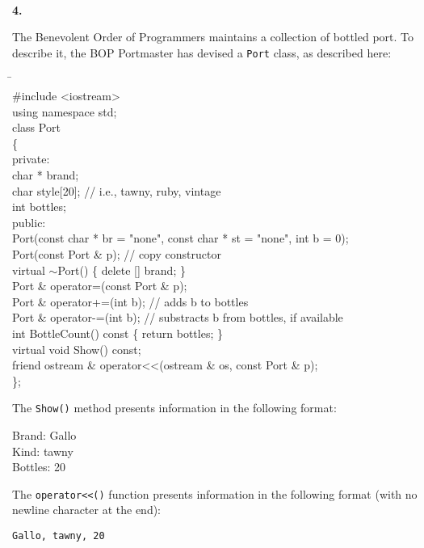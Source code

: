 \documentclass[10 pt]{amsart}
\newlength{\cwidth}
\newenvironment{cpart}[2][\cwidth]
	{%
		\\ %
		\textbf{#2. }%
		\begin{minipage}[t]{#1}%
		\setlength{\parindent}{0pt}%
		\setlength{\parskip}{2ex}%
	}
	{%
		\end{minipage}%
	}
\newcommand{\ttt}[1]{\texttt{#1}}
\begin{document}
	\begin{cpart}{4}
		The Benevolent Order of Programmers maintains a collection of 
		bottled port.
		To describe it, the BOP Portmaster has devised a \ttt{Port}
		class, as described here:
		{\ttfamily
			\begin{tabbing}
				\phantom{\qquad}\=\hspace{6cm}\=\\
				\#include <iostream> \\
				using namespace std; \\
				class Port \\
				\{ \\
				private:
				\+ \\
					char * brand; \\
					char style[20]; // i.e., tawny, ruby, vintage \\
					int bottles; \\
				\< public: \\
					Port(const char * br = "none", 
						const char * st = "none", int b = 0); \\
						Port(const Port \& p); \> // copy constructor \\
						virtual $\sim$Port() \{ delete [] brand; \} \\
						Port \& operator=(const Port \& p); \\
						Port \& operator+=(int b); \> // adds b to bottles \\
						Port \& operator-=(int b); \> 
							// substracts b from bottles, if available \\
						int BottleCount() const \{ return bottles; \} \\
						virtual void Show() const; \\
						friend ostream \& operator<<(ostream & os, 
																const Port \& p); \\
				\< \};
			\end{tabbing}
		}
		The \ttt{Show()} method presents information in the following
		format:
		
		{ \ttfamily
			Brand: Gallo \\
			Kind: tawny \\
			Bottles: 20 \\
		}

		The \ttt{operator<<()} function presents information in the
		following format (with no newline character at the end):

		\ttt{Gallo, tawny, 20}
	\end{cpart}
	\newpage
\end{document}
